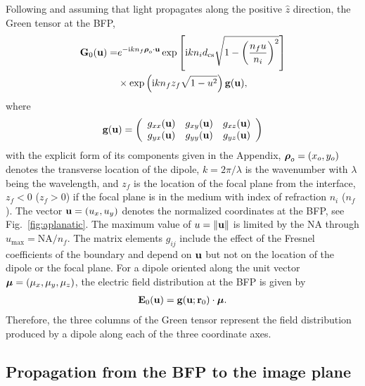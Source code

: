 \documentclass[reprint,aps,pra,superscriptaddress,
amsmath,amssymb]{revtex4-1}
\begin{document}
Following \cite{lieb2004single,novotny2006principles} and assuming that 
light propagates along the positive $\hat z$ direction, the Green tensor 
at the BFP,
\begin{align} \label{eq:G0}
\textbf G_0 (\textbf u) = &   e^{-\text{i} k n_f \boldsymbol \rho_o \cdot \textbf u } 
\exp \left[\text{i} k n_i d_\text{cs} 
\sqrt{1 - \left(\frac{n_f u}{n_i} \right)^2 } \right]  \nonumber \\
& \times \exp \left(\text{i} k n_f z_f \sqrt{1 - u^2} \right) \textbf g (\textbf u) ,
\end{align}
where 
\begin{align}
\textbf g (\textbf u) =
\left(
\begin{array}{ccc}
g_{xx}  (\textbf u)& g_{xy}  (\textbf u)& g_{xz}  (\textbf u) \\
g_{yx}  (\textbf u)& g_{yy}  (\textbf u)& g_{yz} (\textbf u)
\end{array}
\right)
\end{align}
with the explicit form of  its components given in the Appendix,
$\boldsymbol \rho_o =(x_o,y_o)$  denotes the transverse location of the dipole, 
$k=2 \pi/\lambda$ is the wavenumber with $\lambda$ being the wavelength,
and 
$z_f$ is the location of the focal plane from the interface, $z_f<0$ 
($z_f>0$) if the focal plane is in the medium with index of refraction 
$n_i$ ($n_f$). The vector 
$\textbf u = (u_x, u_y)$ denotes the normalized coordinates at the BFP, 
see Fig.~\ref{fig:aplanatic}. The maximum value of $u = \left\lVert\textbf u\right\rVert$ is 
limited by the NA through $u_\text{max} = \text{NA}/n_f$. 
The matrix elements $g_{ij}$ include the effect of the Fresnel coefficients 
of the boundary and depend on $\textbf u$ but not on the location of the dipole 
or the focal plane.  For a dipole oriented along the unit vector 
$\boldsymbol \mu = (\mu_x, \mu_y, \mu_z)$, the electric field distribution at the BFP 
is given by 
\begin{align}
\textbf E_{0} (\textbf u) = \textbf g (\textbf u; \textbf r_0) \cdot \boldsymbol \mu.
\end{align}
Therefore, the three columns of the Green tensor represent the field 
distribution produced by a dipole along each of the three coordinate axes. 


\subsection{Propagation from the BFP to the image plane}
\end{document}
